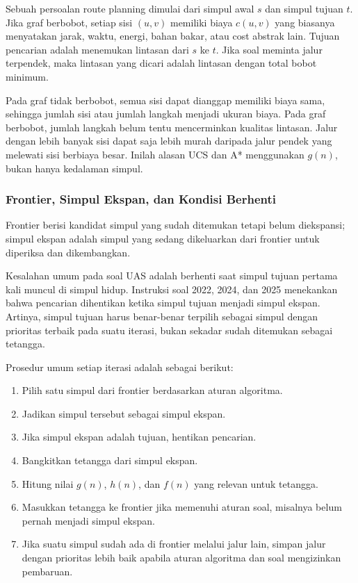 Sebuah persoalan route planning dimulai dari simpul awal $s$ dan simpul tujuan $t$. Jika graf berbobot, setiap sisi $(u,v)$ memiliki biaya $c(u,v)$ yang biasanya menyatakan jarak, waktu, energi, bahan bakar, atau cost abstrak lain. Tujuan pencarian adalah menemukan lintasan dari $s$ ke $t$. Jika soal meminta jalur terpendek, maka lintasan yang dicari adalah lintasan dengan total bobot minimum.

Pada graf tidak berbobot, semua sisi dapat dianggap memiliki biaya sama, sehingga jumlah sisi atau jumlah langkah menjadi ukuran biaya. Pada graf berbobot, jumlah langkah belum tentu mencerminkan kualitas lintasan. Jalur dengan lebih banyak sisi dapat saja lebih murah daripada jalur pendek yang melewati sisi berbiaya besar. Inilah alasan UCS dan A* menggunakan $g(n)$, bukan hanya kedalaman simpul.

\subsubsection{Frontier, Simpul Ekspan, dan Kondisi Berhenti}

\begin{jawab}
Frontier berisi kandidat simpul yang sudah ditemukan tetapi belum diekspansi; simpul ekspan adalah simpul yang sedang dikeluarkan dari frontier untuk diperiksa dan dikembangkan.
\end{jawab}

Kesalahan umum pada soal UAS adalah berhenti saat simpul tujuan pertama kali muncul di simpul hidup. Instruksi soal 2022, 2024, dan 2025 menekankan bahwa pencarian dihentikan ketika simpul tujuan menjadi simpul ekspan. Artinya, simpul tujuan harus benar-benar terpilih sebagai simpul dengan prioritas terbaik pada suatu iterasi, bukan sekadar sudah ditemukan sebagai tetangga.

Prosedur umum setiap iterasi adalah sebagai berikut:
\begin{enumerate}
    \item Pilih satu simpul dari frontier berdasarkan aturan algoritma.
    \item Jadikan simpul tersebut sebagai simpul ekspan.
    \item Jika simpul ekspan adalah tujuan, hentikan pencarian.
    \item Bangkitkan tetangga dari simpul ekspan.
    \item Hitung nilai $g(n)$, $h(n)$, dan $f(n)$ yang relevan untuk tetangga.
    \item Masukkan tetangga ke frontier jika memenuhi aturan soal, misalnya belum pernah menjadi simpul ekspan.
    \item Jika suatu simpul sudah ada di frontier melalui jalur lain, simpan jalur dengan prioritas lebih baik apabila aturan algoritma dan soal mengizinkan pembaruan.
\end{enumerate}

